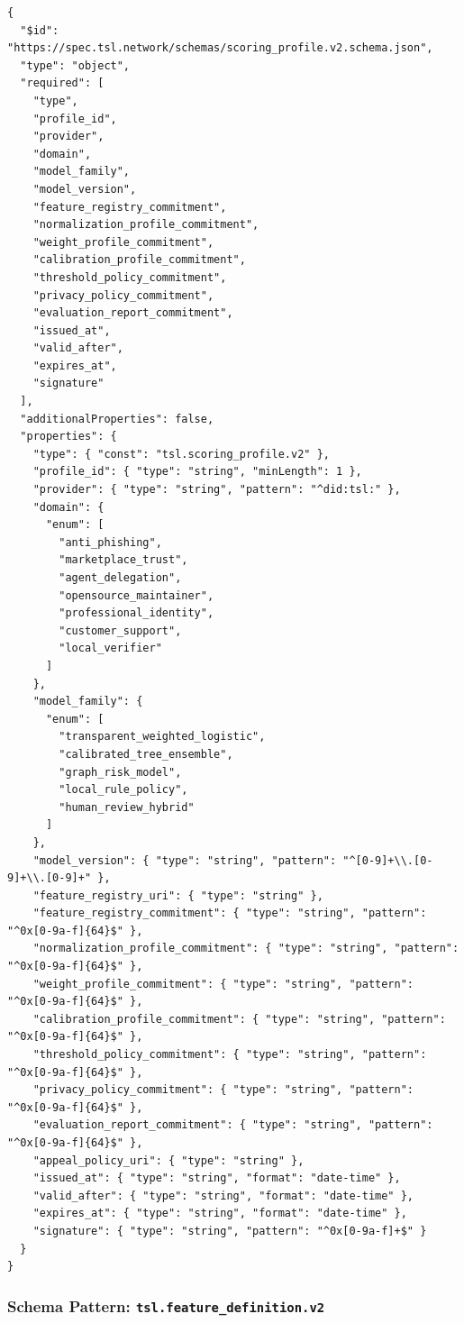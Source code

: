 \documentclass[11pt]{article}
\begin{document}
\begin{lstlisting}[style=tslcode]
{
  "$id": "https://spec.tsl.network/schemas/scoring_profile.v2.schema.json",
  "type": "object",
  "required": [
    "type",
    "profile_id",
    "provider",
    "domain",
    "model_family",
    "model_version",
    "feature_registry_commitment",
    "normalization_profile_commitment",
    "weight_profile_commitment",
    "calibration_profile_commitment",
    "threshold_policy_commitment",
    "privacy_policy_commitment",
    "evaluation_report_commitment",
    "issued_at",
    "valid_after",
    "expires_at",
    "signature"
  ],
  "additionalProperties": false,
  "properties": {
    "type": { "const": "tsl.scoring_profile.v2" },
    "profile_id": { "type": "string", "minLength": 1 },
    "provider": { "type": "string", "pattern": "^did:tsl:" },
    "domain": {
      "enum": [
        "anti_phishing",
        "marketplace_trust",
        "agent_delegation",
        "opensource_maintainer",
        "professional_identity",
        "customer_support",
        "local_verifier"
      ]
    },
    "model_family": {
      "enum": [
        "transparent_weighted_logistic",
        "calibrated_tree_ensemble",
        "graph_risk_model",
        "local_rule_policy",
        "human_review_hybrid"
      ]
    },
    "model_version": { "type": "string", "pattern": "^[0-9]+\\.[0-9]+\\.[0-9]+" },
    "feature_registry_uri": { "type": "string" },
    "feature_registry_commitment": { "type": "string", "pattern": "^0x[0-9a-f]{64}$" },
    "normalization_profile_commitment": { "type": "string", "pattern": "^0x[0-9a-f]{64}$" },
    "weight_profile_commitment": { "type": "string", "pattern": "^0x[0-9a-f]{64}$" },
    "calibration_profile_commitment": { "type": "string", "pattern": "^0x[0-9a-f]{64}$" },
    "threshold_policy_commitment": { "type": "string", "pattern": "^0x[0-9a-f]{64}$" },
    "privacy_policy_commitment": { "type": "string", "pattern": "^0x[0-9a-f]{64}$" },
    "evaluation_report_commitment": { "type": "string", "pattern": "^0x[0-9a-f]{64}$" },
    "appeal_policy_uri": { "type": "string" },
    "issued_at": { "type": "string", "format": "date-time" },
    "valid_after": { "type": "string", "format": "date-time" },
    "expires_at": { "type": "string", "format": "date-time" },
    "signature": { "type": "string", "pattern": "^0x[0-9a-f]+$" }
  }
}
\end{lstlisting}

\subsubsection{Schema Pattern: \texttt{tsl.feature\_definition.v2}}
\end{document}
